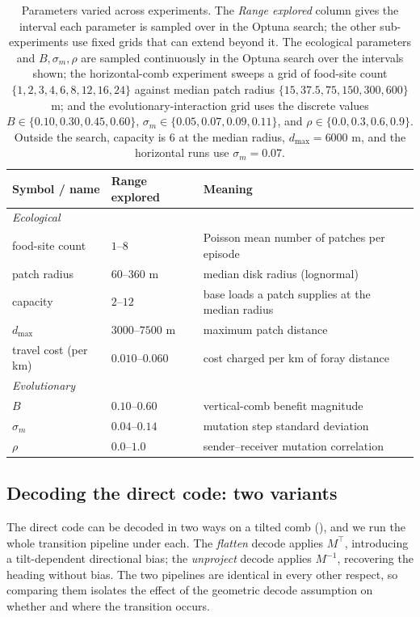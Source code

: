 \begin{table}
  \centering
  \begin{tabular}{lll}
    \toprule
    Symbol / name & Range explored & Meaning \\
    \midrule
    \multicolumn{3}{l}{\emph{Ecological}} \\
    food-site count       & $1$--$8$          & Poisson mean number of patches per episode \\
    patch radius          & $60$--$360$ m     & median disk radius (lognormal) \\
    capacity              & $2$--$12$         & base loads a patch supplies at the median radius \\
    $d_{\max}$            & $3000$--$7500$ m  & maximum patch distance \\
    travel cost (per km)  & $0.010$--$0.060$ & cost charged per km of foray distance \\
    \midrule
    \multicolumn{3}{l}{\emph{Evolutionary}} \\
    $B$        & $0.10$--$0.60$ & vertical-comb benefit magnitude \\
    $\sigma_m$ & $0.04$--$0.14$ & mutation step standard deviation \\
    $\rho$     & $0.0$--$1.0$   & sender--receiver mutation correlation \\
    \bottomrule
  \end{tabular}
  \caption{Parameters varied across experiments. The \emph{Range explored} column
    gives the interval each parameter is sampled over in the Optuna search; the
    other sub-experiments use fixed grids that can extend beyond it. The ecological
    parameters and $B,\sigma_m,\rho$ are sampled continuously in the Optuna search
    over the intervals shown; the horizontal-comb experiment sweeps a grid of
    food-site count $\{1,2,3,4,6,8,12,16,24\}$ against median patch radius
    $\{15, 37.5, 75, 150, 300, 600\}$ m; and the evolutionary-interaction grid
    uses the discrete values $B \in \{0.10, 0.30, 0.45, 0.60\}$,
    $\sigma_m \in \{0.05, 0.07, 0.09, 0.11\}$, and
    $\rho \in \{0.0, 0.3, 0.6, 0.9\}$. Outside the search, capacity is $6$ at the
    median radius, $d_{\max} = 6000$ m, and the horizontal runs use
    $\sigma_m = 0.07$.}
  \label{tab:varied-params}
\end{table}

\subsection{Decoding the direct code: two variants}
\label{sec:setup-decode}
The direct code can be decoded in two ways on a tilted comb
(), and we run the whole transition pipeline under each. The
\emph{flatten} decode applies $M^\top$, introducing a tilt-dependent directional
bias; the \emph{unproject} decode applies $M^{-1}$, recovering the heading without
bias. The two pipelines are identical in every other respect, so comparing them
isolates the effect of the geometric decode assumption on whether and where the
transition occurs.

